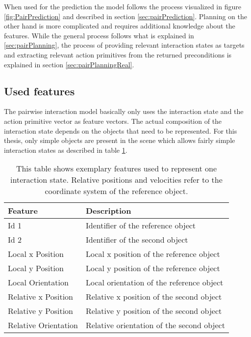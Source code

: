 When used for the prediction the model follows the process visualized in figure \ref{fig:PairPrediction} and described in section \ref{sec:pairPrediction}.
Planning on the other hand is more complicated and requires additional knowledge about the features. While the general process follows what is explained in \ref{sec:pairPlanning}, the process of providing relevant interaction states as targets and extracting relevant action primitives from the returned preconditions is explained in section \ref{sec:pairPlanningReal}.




\subsection{Used features \label{sec:intFeatures}}

The pairwise interaction model basically only uses the interaction state and the action primitive vector as feature vectors. The actual composition of the interaction state depends on the objects that need to be represented. For this thesis, only simple objects are present in the scene which allows fairly simple interaction states as described in table \ref{tab:pairInteractionFeatures}.

\begin{table}
	\centering
	\begin{tabular*}{\textwidth}{@{\extracolsep{\fill} } l l}
		\textbf{Feature} & \textbf{Description} \\ 
		\hline \hline 
		 Id 1 & Identifier of the reference object \\ 
		 Id 2 & Identifier of the second object \\ 
		 Local x Position & Local x position of the reference object \\
		 Local y Position & Local y position of the reference object \\
		 Local Orientation & Local orientation of the reference object \\
		 Relative x Position & Relative x position of the second object \\
		 Relative y Position & Relative y position of the second object \\
		 Relative Orientation & Relative orientation of the second object \\
		\hline 
	\end{tabular*} 
	\caption{This table shows exemplary features used to represent one interaction state. Relative positions and velocities refer to the coordinate system of the reference object.}
	\label{tab:pairInteractionFeatures}
\end{table}

